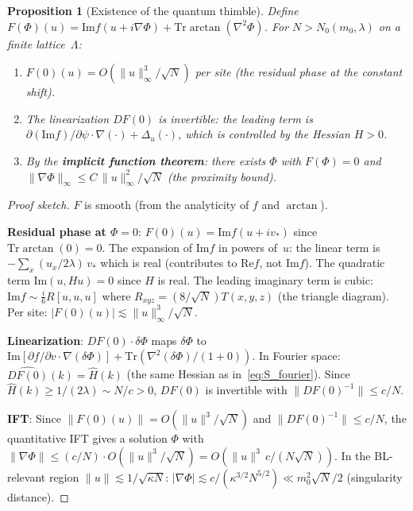 \documentclass[12pt]{article}
\newtheorem{proposition}[theorem]{Proposition}
\theoremstyle{definition}
\theoremstyle{remark}
\newcommand{\Tr}{\mathrm{Tr}}
\newcommand{\La}{\Lambda}
\newcommand{\im}{\mathrm{Im}}
\newcommand{\re}{\mathrm{Re}}
\begin{document}
\begin{proposition}[Existence of the quantum thimble]
\label{prop:quantum_thimble}
Define $F(\Phi)(u) = \im f(u + i\nabla\Phi) + \Tr\arctan(\nabla^2\Phi)$.
For $N > N_0(m_0,\lambda)$ on a finite lattice~$\La$:
\begin{enumerate}
\item $F(0)(u) = O(\|u\|_\infty^3/\sqrt{N})$ per site
  (the residual phase at the constant shift).
\item The linearization $DF(0)$ is invertible: the leading term
  is $\partial(\im f)/\partial\psi \cdot \nabla(\cdot) +
  \Delta_u(\cdot)$, which is controlled by the Hessian $H > 0$.
\item By the \textbf{implicit function theorem}: there exists
  $\Phi$ with $F(\Phi) = 0$ and
  $\|\nabla\Phi\|_\infty \le C\,\|u\|_\infty^2/\sqrt{N}$
  (the proximity bound).
\end{enumerate}
\end{proposition}

\begin{proof}[Proof sketch]
$F$ is smooth (from the analyticity of $f$ and $\arctan$).

\textbf{Residual phase at $\Phi=0$}: $F(0)(u) = \im f(u+iv_*)$
since $\Tr\arctan(0) = 0$. The expansion of $\im f$ in powers
of~$u$: the linear term is $-\sum_x (u_x/2\lambda)\,v_*$ which
is real (contributes to $\re f$, not $\im f$). The quadratic
term $\im(u,Hu) = 0$ since $H$ is real. The leading imaginary
term is cubic: $\im f \sim \frac{i}{6}R[u,u,u]$ where
$R_{xyz} = (8/\sqrt{N})T(x,y,z)$ (the triangle diagram).
Per site: $|F(0)(u)| \lesssim \|u\|_\infty^3/\sqrt{N}$.

\textbf{Linearization}: $DF(0) \cdot \delta\Phi$ maps $\delta\Phi$
to $\im[\partial f/\partial v \cdot \nabla(\delta\Phi)]
+ \Tr(\nabla^2(\delta\Phi)/(1+0))$. In Fourier space:
$\widehat{DF(0)}(k) = \hat{H}(k)$ (the same Hessian as
in~\eqref{eq:S_fourier}). Since $\hat{H}(k) \ge 1/(2\lambda)
\sim N/c > 0$, $DF(0)$ is invertible with $\|DF(0)^{-1}\| \le c/N$.

\textbf{IFT}: Since $\|F(0)(u)\| = O(\|u\|^3/\sqrt{N})$ and
$\|DF(0)^{-1}\| \le c/N$, the quantitative IFT gives a solution
$\Phi$ with $\|\nabla\Phi\| \le (c/N) \cdot O(\|u\|^3/\sqrt{N})
= O(\|u\|^3\,c/(N\sqrt{N}))$. In the BL-relevant region
$\|u\| \lesssim 1/\sqrt{\kappa N}$: $|\nabla\Phi| \lesssim
c/(\kappa^{3/2} N^{5/2}) \ll m_0^2\sqrt{N}/2$ (singularity distance).
\end{proof}
\end{document}
